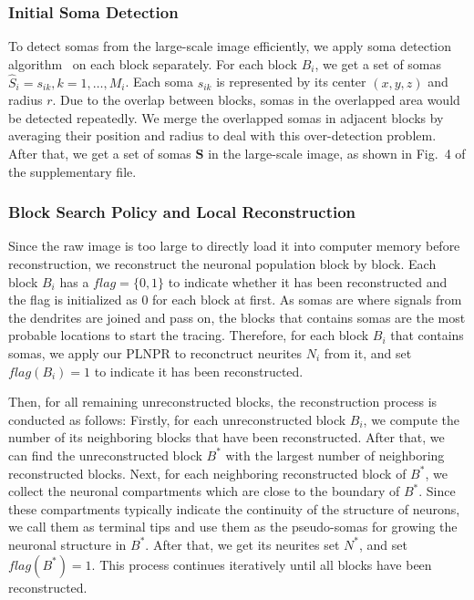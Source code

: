 \subsubsection{Initial Soma Detection}
\label{sec:soma}

To detect somas from the large-scale image efficiently, we apply soma detection algorithm~\cite{Quan2013} on each block separately. For each block $ B_{i} $, we get a set of somas $ \hat{S}_i = s_{ik}, k=1,\ldots,M_{i} $. Each soma $ s_{ik} $ is represented by its center $ (x,y,z) $ and radius $ r $.
Due to the overlap between blocks, somas in the overlapped area would be detected repeatedly.
We merge the overlapped somas in adjacent blocks by averaging their position and radius to deal with this over-detection problem.
After that, we get a set of somas $ \mathbf{S} $ in the large-scale image, as shown in Fig.~{4} of the supplementary file.


\subsubsection{Block Search Policy and Local Reconstruction}
\label{sec:trace}

Since the raw image is too large to directly load it into computer memory before reconstruction, we reconstruct the neuronal population block by block.
%
Each block $ B_{i} $  has a $ flag =  \{0,1\}$ to indicate whether it has been reconstructed and the flag is initialized as $ 0 $ for each block at first.
%
As somas are where signals from the dendrites are joined and pass on, the blocks that contains somas are the most probable locations to start the tracing.
Therefore, for each block $ B_{i} $ that contains somas, we apply our PLNPR to reconctruct neurites $ N_{i} $ from it, and set $ flag(B_{i}) = 1 $ to indicate it has been reconstructed.

Then, for all remaining unreconstructed blocks, the reconstruction process is conducted as follows:
%
Firstly, for each unreconstructed block $ B_{i} $, we compute the number of its neighboring blocks that have been reconstructed.  After that, we can find the unreconstructed block $ B^* $ with the largest number of neighboring reconstructed blocks.
%
Next, for each neighboring reconstructed block of $ B^* $, we collect the neuronal compartments which are close to the boundary of $ B^* $. Since these compartments typically indicate the continuity of the structure of neurons,  we call them as terminal tips and use them as the pseudo-somas for growing the neuronal structure in $ B^* $.
After that, we get its neurites set $ N^* $, and set $ flag(B^*) = 1 $.
%
This process continues iteratively until all blocks have been reconstructed.

